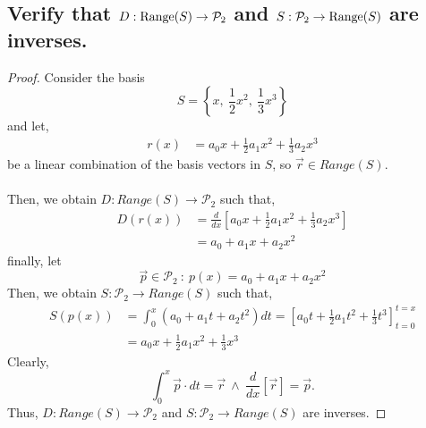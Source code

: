 \documentclass[../main.tex]{subfiles}
\begin{document}
\subsection{Verify that $D: {\rm Range}(S) \to \mathcal{P}_2$ and $S: \mathcal{P}_2 \to {\rm Range}(S)$ are inverses.}
\begin{proof}
        Consider the basis
        \begin{equation*}
                S=\left\{x,\ \frac{1}{2} x^{2} ,\ \frac{1}{3} x^{3}\right\}
        \end{equation*}
        and let,
        \begin{align*}
                r( x) & =a_{0} x+\frac{1}{2} a_{1} x^{2} +\frac{1}{3} a_{2} x^{3}
        \end{align*}
        be a linear combination of the basis vectors in $\displaystyle S$, so $\displaystyle \vec{r} \in Range( S)$.\\\\
        Then, we obtain $\displaystyle D:Range( S)\rightarrow \mathcal{P}_{2}$ such that,
        \begin{align*}
                D( r( x)) & =\frac{d}{dx}\left[ a_{0} x+\frac{1}{2} a_{1} x^{2} +\frac{1}{3} a_{2} x^{3}\right] \\
                          & =a_{0} +a_{1} x+a_{2} x^{2}
        \end{align*}
        finally, let
        \begin{equation*}
                \vec{p} \in \mathcal{P}_{2} \ :\ p( x) =a_{0} +a_{1} x+a_{2} x^{2}
        \end{equation*}
        Then, we obtain $\displaystyle S:\mathcal{P}_{2}\rightarrow Range( S)$ such that,
        \begin{align*}
                S( p( x)) & =\int _{0}^{x}\left( a_{0} +a_{1} t+a_{2} t^{2}\right) dt=\left[ a_{0} t+\frac{1}{2} a_{1} t^{2} +\frac{1}{3} t^{3}\right]_{t=0}^{t=x} \\
                          & =a_{0} x+\frac{1}{2} a_{1} x^{2} +\frac{1}{3} x^{3}
        \end{align*}
        Clearly,
        \begin{equation*}
                {\displaystyle \int _{0}^{x}\vec{p} \cdot dt=\vec{r}} \ \land \ {\displaystyle \frac{d}{dx} [\vec{r} ]=\vec{p}} .
        \end{equation*}Thus, ${\displaystyle D:Range(S)\rightarrow \mathcal{P}_{2}}$ and ${\displaystyle S:\mathcal{P}_{2}\rightarrow Range(S)}$ are inverses.
\end{proof}
\end{document}
